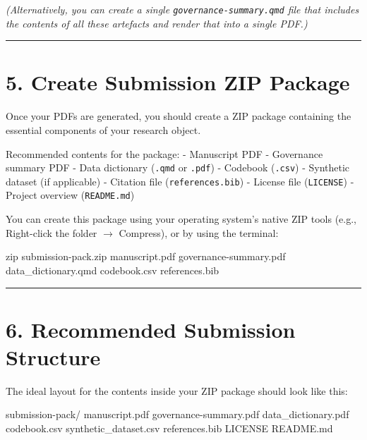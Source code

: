 \documentclass[
]{report}
\newenvironment{Shaded}{\begin{snugshade}}{\end{snugshade}}
\newcommand{\FunctionTok}[1]{\textcolor[rgb]{0.28,0.35,0.67}{#1}}
\newcommand{\NormalTok}[1]{\textcolor[rgb]{0.00,0.23,0.31}{#1}}
\begin{document}
\emph{(Alternatively, you can create a single
\texttt{governance-summary.qmd} file that includes the contents of all
these artefacts and render that into a single PDF.)}

\begin{center}\rule{0.5\linewidth}{0.5pt}\end{center}

\chapter{5. Create Submission ZIP
Package}\label{create-submission-zip-package}

Once your PDFs are generated, you should create a ZIP package containing
the essential components of your research object.

Recommended contents for the package: - Manuscript PDF - Governance
summary PDF - Data dictionary (\texttt{.qmd} or \texttt{.pdf}) -
Codebook (\texttt{.csv}) - Synthetic dataset (if applicable) - Citation
file (\texttt{references.bib}) - License file (\texttt{LICENSE}) -
Project overview (\texttt{README.md})

You can create this package using your operating system's native ZIP
tools (e.g., Right-click the folder \(\to\) Compress), or by using the
terminal:

\begin{Shaded}
\begin{Highlighting}[]
\FunctionTok{zip}\NormalTok{ submission{-}pack.zip manuscript.pdf governance{-}summary.pdf data\_dictionary.qmd codebook.csv references.bib}
\end{Highlighting}
\end{Shaded}

\begin{center}\rule{0.5\linewidth}{0.5pt}\end{center}

\chapter{6. Recommended Submission
Structure}\label{recommended-submission-structure}

The ideal layout for the contents inside your ZIP package should look
like this:

\begin{Shaded}
\begin{Highlighting}[]
\NormalTok{submission{-}pack/}
\NormalTok{  manuscript.pdf}
\NormalTok{  governance{-}summary.pdf}
\NormalTok{  data\_dictionary.pdf}
\NormalTok{  codebook.csv}
\NormalTok{  synthetic\_dataset.csv}
\NormalTok{  references.bib}
\NormalTok{  LICENSE}
\NormalTok{  README.md}
\end{Highlighting}
\end{Shaded}
\end{document}
